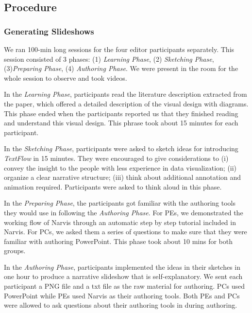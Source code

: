 \subsection{Procedure}
\subsubsection{Generating Slideshows}
We ran 100-min long sessions for the four editor participants separately. This session consisted of 3 phases: (1) \textit{Learning Phase}, (2) \textit{Sketching Phase}, (3)\textit{Preparing Phase}, (4) \textit{Authoring Phase}. We were present in the room for the whole session to observe and took videos. 

In the \textit{Learning Phase}, participants read the literature description extracted from the paper, which offered a detailed description of the visual design with diagrams. This phase ended when the participants reported us that they finished reading and understand this visual design. 
This phrase took about 15 minutes for each participant.

In the \textit{Sketching Phase}, participants were asked to sketch ideas for introducing \textit{TextFlow} in 15 minutes. They were encouraged to give considerations to (i) convey the insight to the people with less experience in data visualization; (ii) organize a clear narrative structure; (iii) think about additional annotation and animation required. Participants were asked to think aloud in this phase. 

In the \textit{Preparing Phase}, the participants got familiar with the authoring tools they would use in following the \textit{Authoring Phase}. For PEs, we demonstrated the working flow of Narvis through an automatic step by step tutorial included in Narvis. For PCs, we asked them a series of questions to make sure that they were familiar with authoring PowerPoint. This phase took about 10 mins for both groups.  

In the \textit{Authoring Phase}, participants implemented the ideas in their sketches in one hour to produce a narrative slideshow that is self-explanatory. 
We sent each participant a PNG file and a txt file as the raw material for authoring. PCs used PowerPoint while PEs used Narvis as their authoring tools. Both PEs and PCs were allowed to ask questions about their authoring tools in during authoring. 


